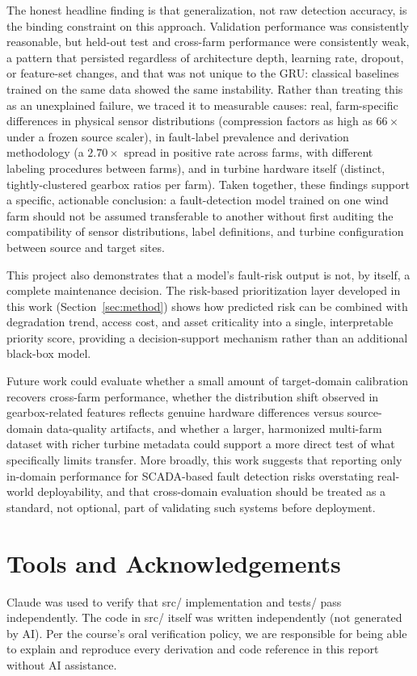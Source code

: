 \documentclass[conference]{IEEEtran}
\begin{document}
The honest headline finding is that generalization, not raw detection
accuracy, is the binding constraint on this approach. Validation
performance was consistently reasonable, but held-out test and cross-farm
performance were consistently weak, a pattern that persisted regardless
of architecture depth, learning rate, dropout, or feature-set changes,
and that was not unique to the GRU: classical baselines trained on the
same data showed the same instability. Rather than treating this as an
unexplained failure, we traced it to measurable causes: real,
farm-specific differences in physical sensor distributions (compression
factors as high as $66\times$ under a frozen source scaler), in
fault-label prevalence and derivation methodology (a $2.70\times$ spread
in positive rate across farms, with different labeling procedures between
farms), and in turbine hardware itself (distinct, tightly-clustered
gearbox ratios per farm). Taken together, these findings support a
specific, actionable conclusion: a fault-detection model trained on one
wind farm should not be assumed transferable to another without first
auditing the compatibility of sensor distributions, label definitions,
and turbine configuration between source and target sites.
 
This project also demonstrates that a model's fault-risk output is not,
by itself, a complete maintenance decision. The risk-based prioritization
layer developed in this work (Section~\ref{sec:method}) shows how
predicted risk can be combined with degradation trend, access cost, and
asset criticality into a single, interpretable priority score, providing
a decision-support mechanism rather than an additional black-box model.
 
Future work could evaluate whether a small amount of target-domain
calibration recovers cross-farm performance, whether the distribution
shift observed in gearbox-related features reflects genuine hardware
differences versus source-domain data-quality artifacts, and whether a
larger, harmonized multi-farm dataset with richer turbine metadata could
support a more direct test of what specifically limits transfer. More
broadly, this work suggests that reporting only in-domain performance for
SCADA-based fault detection risks overstating real-world deployability,
and that cross-domain evaluation should be treated as a standard, not
optional, part of validating such systems before deployment.

\section*{Tools and Acknowledgements}
Claude was used to verify that src/ implementation and tests/ pass independently. The code in src/ itself was written independently (not generated by AI). Per the course’s oral verification policy, we are responsible for being able to
explain and reproduce every derivation and code reference in
this report without AI assistance.
\end{document}
